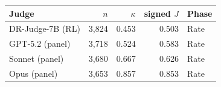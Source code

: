 \begin{tabular}{lrrrl}
\toprule
Judge & $n$ & $\kappa$ & signed $J$ & Phase\\
\midrule
DR-Judge-7B (RL) & 3,824 & 0.453 & 0.503 & Rate \\
GPT-5.2 (panel) & 3,718 & 0.524 & 0.583 & Rate \\
Sonnet (panel) & 3,680 & 0.667 & 0.626 & Rate \\
Opus (panel) & 3,653 & 0.857 & 0.853 & Rate \\
\bottomrule
\end{tabular}
